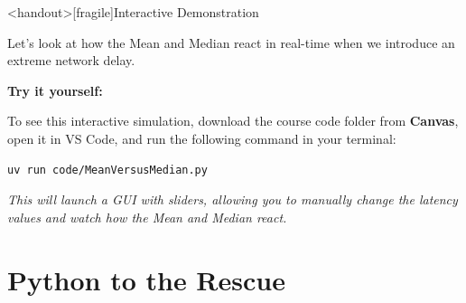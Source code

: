 \begin{frame}<handout>[fragile]{Interactive Demonstration}
    
    Let's look at how the Mean and Median react in real-time when we introduce an extreme network delay.
    
    \vspace{0.5cm}
    \textbf{Try it yourself:}
    
    To see this interactive simulation, download the course code folder from \textbf{Canvas}, open it in VS Code, and run the following command in your terminal:
    
    \begin{lstlisting}[language=bash]
uv run code/MeanVersusMedian.py
    \end{lstlisting}
    
    \vspace{0.2cm}
    \textit{This will launch a GUI with sliders, allowing you to manually change the latency values and watch how the Mean and Median react.}
\end{frame}

\section{Python to the Rescue}
